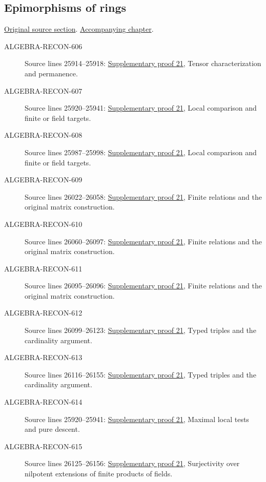 \subsection{Epimorphisms of rings}
\hypertarget{algebra-source-section-epimorphism}{}
\noindent\href{https://github.com/stacks/stacks-project/blob/a04446e57ec1fbc252a871afcec7752fb2807b14/algebra.tex\#L25862}{Original source section}. \href{algebra.pdf\#nameddest=section-epimorphism}{Accompanying chapter}.

\begin{description}
\item[ALGEBRA-RECON-606] Source lines 25914--25918: \hyperlink{algebra_epimorphism_notes_20260928}{Supplementary proof 21}, Tensor characterization and permanence.
\item[ALGEBRA-RECON-607] Source lines 25920--25941: \hyperlink{algebra_epimorphism_notes_20260928}{Supplementary proof 21}, Local comparison and finite or field targets.
\item[ALGEBRA-RECON-608] Source lines 25987--25998: \hyperlink{algebra_epimorphism_notes_20260928}{Supplementary proof 21}, Local comparison and finite or field targets.
\item[ALGEBRA-RECON-609] Source lines 26022--26058: \hyperlink{algebra_epimorphism_notes_20260928}{Supplementary proof 21}, Finite relations and the original matrix construction.
\item[ALGEBRA-RECON-610] Source lines 26060--26097: \hyperlink{algebra_epimorphism_notes_20260928}{Supplementary proof 21}, Finite relations and the original matrix construction.
\item[ALGEBRA-RECON-611] Source lines 26095--26096: \hyperlink{algebra_epimorphism_notes_20260928}{Supplementary proof 21}, Finite relations and the original matrix construction.
\item[ALGEBRA-RECON-612] Source lines 26099--26123: \hyperlink{algebra_epimorphism_notes_20260928}{Supplementary proof 21}, Typed triples and the cardinality argument.
\item[ALGEBRA-RECON-613] Source lines 26116--26155: \hyperlink{algebra_epimorphism_notes_20260928}{Supplementary proof 21}, Typed triples and the cardinality argument.
\item[ALGEBRA-RECON-614] Source lines 25920--25941: \hyperlink{algebra_epimorphism_notes_20260928}{Supplementary proof 21}, Maximal local tests and pure descent.
\item[ALGEBRA-RECON-615] Source lines 26125--26156: \hyperlink{algebra_epimorphism_notes_20260928}{Supplementary proof 21}, Surjectivity over nilpotent extensions of finite products of fields.
\end{description}

